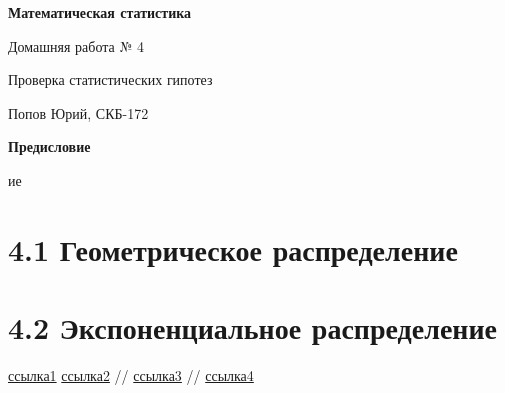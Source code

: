 \documentclass[a4paper,12pt, oneside]{book}
\begin{document}
	\pagestyle{plain}
	
	\begin{titlepage}	
		\begin{center}
			{\Huge \textbf{Математическая статистика}}
			\vspace{30mm}
			
			{\Huge Домашняя работа № 4 \\}
			\vspace{30mm}
			
			{\huge Проверка статистических гипотез}
			\vspace{30mm}
			
			{\Large Попов Юрий, СКБ-172}
		\end{center}
	\end{titlepage}
	
	
	
	\begin{spacing}{0.99}          
		\tableofcontents %
	\end{spacing}

\newpage
\begin{center}
	{\Huge{\bf{Предисловие}}}
\end{center}


ие
\setcounter{secnumdepth}{-1} %




\newpage
\chapter{4.1 Геометрическое распределение}


\newpage
\chapter{4.2 Экспоненциальное распределение}


\begin{thebibliography}{99}
	 \href{https://towardsdatascience.com/what-is-exponential-distribution-7bdd08590e2a}{ссылка1}
	  \href{https://www.statisticshowto.datasciencecentral.com/exponential-distribution/}{ссылка2}
	  // \href{http://www.ams.jhu.edu/~dan/550.435/notes/COURSENOTES435.pdf}{ссылка3}
	  // \href{http://www.obzh.ru/nad/4-3.html}{ссылка4}
\end{thebibliography}
\end{document}
